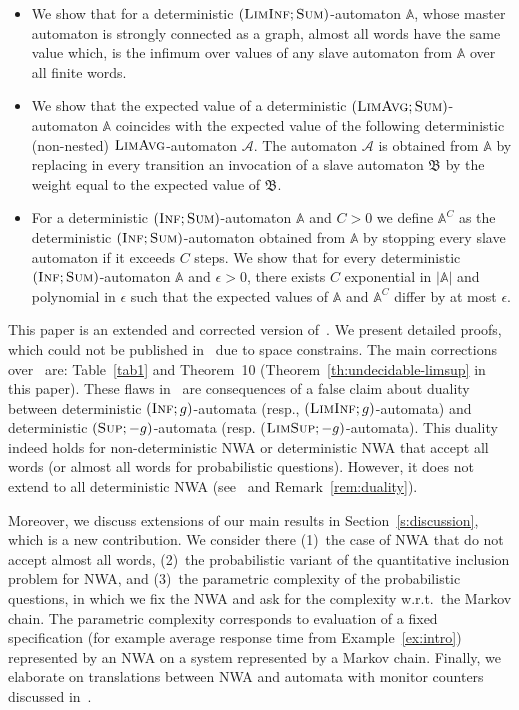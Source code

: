 \documentclass{lmcs}
\newcommand{\nestedA}{\mathbb{A}}
\newcommand{\slaveA}{{\mathfrak{B}}}
\newcommand{\nonnestedA}{\mathcal{A}}
\newcommand{\fsum}{\textsc{Sum}}
\newcommand{\flimavg}{\textsc{LimAvg}}
\newcommand{\fliminf}{\textsc{LimInf}}
\newcommand{\flimsup}{\textsc{LimSup}}
\newcommand{\fsup}{\textsc{Sup}}
\newcommand{\finf}{\textsc{Inf}}
\begin{document}
\begin{itemize}
\item We show that for a deterministic $(\fliminf;\fsum)$-automaton $\nestedA$, whose master automaton is strongly connected as a graph,
almost all words have the same value which, is the infimum over values of any slave automaton from $\nestedA$ over all finite words.

\item We show that the expected value of a deterministic $(\flimavg;\fsum)$-automaton $\nestedA$
coincides with the expected value of the following deterministic (non-nested)
$\flimavg$-automaton $\nonnestedA$.
The automaton $\nonnestedA$ is obtained from $\nestedA$ by replacing in every transition
an invocation of a slave automaton $\slaveA$ by the weight equal to the expected value of $\slaveA$.

\item For a deterministic $(\finf;\fsum)$-automaton $\nestedA$ and $C>0$ we define $\nestedA^C$ as
the deterministic $(\finf;\fsum)$-automaton obtained from $\nestedA$ by stopping every slave automaton if it exceeds $C$ steps.
We show that for every deterministic $(\finf;\fsum)$-automaton $\nestedA$ and $\epsilon >0$, there exists $C$ exponential in $|\nestedA|$
and polynomial in $\epsilon$ such that the expected values of $\nestedA$ and $\nestedA^C$ differ by at most $\epsilon$.
\end{itemize}

\noindent
This paper is an extended and corrected version of~\cite{conferenceVersion,DBLP:conf/sas/ChatterjeeHO16}. We present detailed proofs, which
could not be published in~\cite{conferenceVersion} due to space constrains.
The main corrections over~\cite{conferenceVersion} are: Table~\ref{tab1} and
Theorem~10 (Theorem~\ref{th:undecidable-limsup} in this paper).
These flaws in~\cite{conferenceVersion} are consequences of a false claim about duality
between deterministic $(\finf;g)$-automata (resp., $(\fliminf;g)$-automata) and deterministic
 $(\fsup;-g)$-automata (resp. ($\flimsup;-g)$-automata).
This duality indeed holds for non-deterministic NWA or deterministic NWA that accept all words (or almost all words for
 probabilistic questions).
However, it does not extend to all deterministic NWA (see~\cite{nested} and Remark~\ref{rem:duality}).

Moreover, we discuss extensions of our main results in Section~\ref{s:discussion}, which is a new contribution.
We consider there (1)~the case of NWA that do not accept almost all words, (2)~the probabilistic variant of the quantitative inclusion problem for NWA, and
(3)~the parametric complexity of the probabilistic questions, in which we fix the NWA and ask for the complexity w.r.t.\ the Markov chain.
The parametric complexity corresponds to evaluation of a fixed specification (for example average response time from Example~\ref{ex:intro})
represented by an NWA  on a system represented by a Markov chain.
Finally, we elaborate on translations between NWA and automata with monitor counters discussed in~\cite{conferenceVersion,DBLP:conf/sas/ChatterjeeHO16}.
\end{document}
